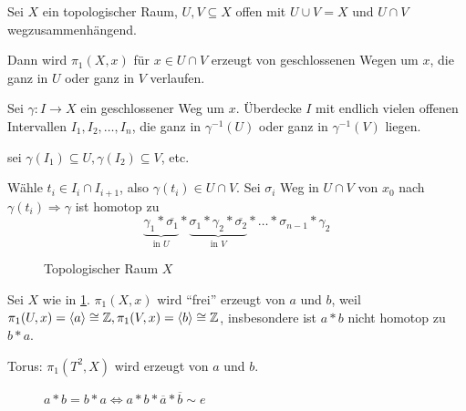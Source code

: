 \begin{satz}\label{thm:seifert-van-kampen}
    Sei $X$ ein topologischer Raum, $U, V \subseteq X$ offen mit 
    $U \cup V = X$ und $U \cap V$ wegzusammenhängend.

    Dann wird $\pi_1(X,x)$ für $x \in U \cap V$ erzeugt von geschlossenen
    Wegen um $x$, die ganz in $U$ oder ganz in $V$ verlaufen.
\end{satz}

\begin{beweis}
    Sei $\gamma: I \rightarrow X$ ein geschlossener Weg um $x$.
    Überdecke $I$ mit endlich vielen offenen Intervallen
    $I_1, I_2, \dots, I_n$, die ganz in 
    $\gamma^{-1}(U)$ oder ganz in $\gamma^{-1}(V)$ liegen.

    \Obda sei $\gamma(I_1) \subseteq U, \gamma(I_2) \subseteq V$, etc.

    Wähle $t_i \in I_i \cap I_{i+1}$, also $\gamma(t_i) \in U \cap V$.
    Sei $\sigma_i$ Weg in $U \cap V$ von $x_0$ nach $\gamma(t_i) \Rightarrow \gamma$
    ist homotop zu 
    \[\underbrace{\gamma_1 * \overline{\sigma_1}}_{\text{in } U} * \underbrace{\sigma_1 * \gamma_2 * \overline{\sigma_2}}_{\text{in } V} * \dots * \sigma_{n-1} * \gamma_2\]
\end{beweis}

\begin{beispiel}
    \begin{bspenum}
        \item
            \begin{figure}[htp]
                \centering
                
                \caption{Topologischer Raum $X$}
                \label{fig:top-raum-kreise}
            \end{figure}

            Sei $X$ wie in \cref{fig:top-raum-kreise}. $\pi_1(X,x)$ wird \enquote{frei} erzeugt von $a$ und $b$, weil
            $\pi_1(U,x) = \langle a \rangle \cong \mathbb{Z}, \pi_1(V,x) = \langle b \rangle \cong \mathbb{Z}$,
            insbesondere ist $a*b$ nicht homotop zu $b*a$.
        \item Torus: $\pi_1(T^2, X)$ wird erzeugt von $a$ und $b$.
            \begin{figure}[htp]
                \centering
                
                \caption{$a*b = b*a \Leftrightarrow a * b * \overline{a} * \overline{b} \sim e$}
                \label{fig:torous-a-b}
            \end{figure}
    \end{bspenum}
\end{beispiel}

